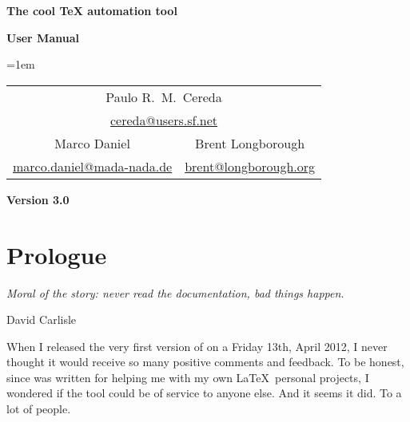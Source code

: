 \documentclass[a4paper,twoside,12pt]{memoir}
\newcommand{\araraversion}{3.0}
\begin{document}
\begin{titlingpage}

\begin{center}
\vspace*{2em}

\scalebox{1.15}{\araralogo}

\vspace{2em}

{\color{araracolor}\bfseries\Huge The cool \TeX{} automation tool}

\vspace{10em}

{\Huge\sffamily\bfseries User Manual}

\vspace{3em}

{\large
\tabcolsep=1em
\begin{tabular}{cc}
\multicolumn{2}{c}{Paulo R.\ M.\ Cereda}\\
\multicolumn{2}{c}{\url{cereda@users.sf.net}}\\[1.5em]
Marco Daniel & Brent Longborough\\
\url{marco.daniel@mada-nada.de} & \url{brent@longborough.org}
\end{tabular}}

\vfill

{\LARGE\sffamily\bfseries Version \araraversion}

\end{center}

\end{titlingpage}

\pagestyle{headings} 
\frontmatter
\nouppercaseheads

\chapter*{Prologue}
\label{chap:prologue}

\epigraph{\emph{Moral of the story: never read the documentation, bad things happen.}}{David Carlisle}

When I released the very first version of \arara on a Friday 13th, April 2012, I never thought it would receive so many positive comments and feedback. To be honest, since \arara was written for helping me with my own \LaTeX\ personal projects, I wondered if the tool could be of service to anyone else. And it seems it did. To a lot of people.
\end{document}
